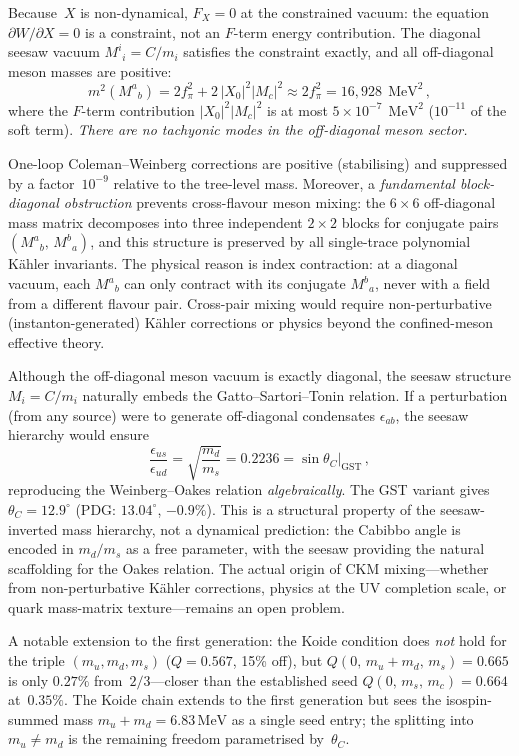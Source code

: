 \documentclass[12pt,a4paper]{article}
\newcommand{\MeV}{\,\text{MeV}}
\newcommand{\fpi}{f_\pi}
\begin{document}
Because~$X$ is non-dynamical, $F_X = 0$ at the constrained vacuum:
the equation $\partial W/\partial X = 0$ is a constraint, not an
$F$-term energy contribution.  The diagonal seesaw vacuum
$M^i{}_i = C/m_i$ satisfies the constraint exactly, and all
off-diagonal meson masses are positive:
\[
  m^2(M^a{}_b) = 2\fpi^2 + 2\,|X_0|^2 |M_c|^2
  \approx 2\fpi^2 = 16{,}928\;\MeV^2\,,
\]
where the $F$-term contribution $|X_0|^2|M_c|^2$ is at most
$5\times 10^{-7}\;\MeV^2$ ($10^{-11}$ of the soft term).
\emph{There are no tachyonic modes in the off-diagonal meson sector.}

One-loop Coleman--Weinberg corrections are positive
(stabilising) and suppressed by a factor~$10^{-9}$ relative to
the tree-level mass.  Moreover, a \emph{fundamental block-diagonal
obstruction} prevents cross-flavour meson mixing: the $6\times 6$
off-diagonal mass matrix decomposes into three independent
$2\times 2$ blocks for conjugate pairs $(M^a{}_b,\,M^b{}_a)$,
and this structure is preserved by all single-trace polynomial
K\"ahler invariants.  The physical reason is index contraction:
at a diagonal vacuum, each $M^a{}_b$ can only contract with its
conjugate $M^b{}_a$, never with a field from a different
flavour pair.  Cross-pair mixing would require non-perturbative
(instanton-generated) K\"ahler corrections or physics beyond the
confined-meson effective theory.

Although the off-diagonal meson vacuum is exactly diagonal, the
seesaw structure $M_i = C/m_i$ naturally embeds the
Gatto--Sartori--Tonin relation.  If a perturbation (from any source)
were to generate off-diagonal condensates $\epsilon_{ab}$, the
seesaw hierarchy would ensure
\[
  \frac{\epsilon_{us}}{\epsilon_{ud}}
  = \sqrt{\frac{m_d}{m_s}} = 0.2236
  = \sin\theta_C\big|_{\text{GST}}\,,
\]
reproducing the Weinberg--Oakes relation \emph{algebraically}.
The GST variant gives $\theta_C = 12.9^\circ$ (PDG:
$13.04^\circ$, $-0.9\%$).  This is a structural property of the
seesaw-inverted mass hierarchy, not a dynamical prediction: the
Cabibbo angle is encoded in $m_d/m_s$ as a free parameter,
with the seesaw providing the natural scaffolding for the Oakes
relation.  The actual origin of CKM mixing---whether from
non-perturbative K\"ahler corrections, physics at the UV
completion scale, or quark mass-matrix texture---remains an
open problem.

A notable extension to the first generation:
the Koide condition does \emph{not} hold for the triple
$(m_u, m_d, m_s)$ ($Q = 0.567$, 15\% off), but
$Q(0,\,m_u{+}m_d,\,m_s) = 0.665$ is only $0.27\%$ from~$2/3$---closer
than the established seed $Q(0,\,m_s,\,m_c) = 0.664$
at~$0.35\%$.  The Koide chain extends to the first generation but
sees the isospin-summed mass $m_u + m_d = 6.83\MeV$ as a single
seed entry; the splitting into $m_u \neq m_d$ is the remaining
freedom parametrised by~$\theta_C$.
\end{document}
